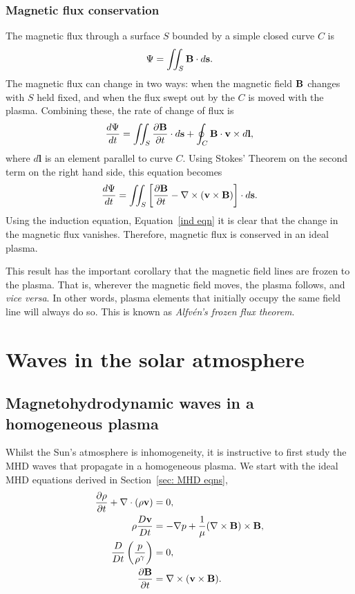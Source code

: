 \subsubsection{Magnetic flux conservation} \label{sec: mag flux conservation}
The magnetic flux through a surface $S$ bounded by a simple closed curve $C$ is
\begin{equation}
	\Psi = \iint_S \mathbf{B}\cdot d\mathbf{s}.
\end{equation}
The magnetic flux can change in two ways: when the magnetic field $\mathbf{B}$ changes with $S$ held fixed, and when the flux swept out by the $C$ is moved with the plasma. Combining these, the rate of change of flux is
\begin{equation}
	\frac{d \Psi}{dt} = \iint_S \frac{\partial\mathbf{B}}{\partial t}\cdot d\mathbf{s} + \oint_C \mathbf{B}\cdot \mathbf{v} \times d\mathbf{l},
\end{equation}
where $d\mathbf{l}$ is an element parallel to curve $C$. Using Stokes' Theorem on the second term on the right hand side, this equation becomes
\begin{equation}
\frac{d \Psi}{dt} = \iint_S \left[ \frac{\partial\mathbf{B}}{\partial t} - \nabla\times(\mathbf{v}\times\mathbf{B}) \right] \cdot d\mathbf{s}.
\end{equation}
Using the induction equation, Equation~\eqref{ind eqn} it is clear that the change in the magnetic flux vanishes. Therefore, magnetic flux is conserved in an ideal plasma.

This result has the important corollary that the magnetic field lines are frozen to the plasma. That is, wherever the magnetic field moves, the plasma follows, and \textit{vice versa}. In other words, plasma elements that initially occupy the same field line will always do so. This is known as \textit{Alfv\'{e}n's frozen flux theorem}.


\section{Waves in the solar atmosphere}
\label{sec: waves}

\subsection{Magnetohydrodynamic waves in a homogeneous plasma}
Whilst the Sun's atmosphere is inhomogeneity, it is instructive to first study the MHD waves that propagate in a homogeneous plasma. We start with the ideal MHD equations derived in Section~\ref{sec: MHD eqns},
\begin{align}
	\frac{\partial\rho}{\partial t} + \nabla\cdot(\rho \mathbf{v}) &= 0, \\
	\rho\frac{D\mathbf{v}}{Dt} &= -\nabla p + \frac{1}{\mu}(\nabla\times\mathbf{B})\times\mathbf{B}, \\
	\frac{D}{Dt}\left(\frac{p}{\rho^\gamma}\right) &= 0, \\
	\frac{\partial\mathbf{B}}{\partial t} &= \nabla\times(\mathbf{v}\times\mathbf{B}).
\end{align}

